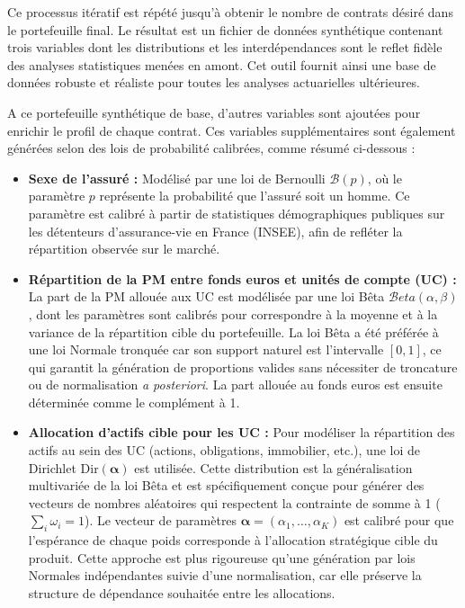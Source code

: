 Ce processus itératif est répété jusqu'à obtenir le nombre de contrats désiré dans le portefeuille final. Le résultat est un fichier de données synthétique contenant trois variables dont les distributions et les interdépendances sont le reflet fidèle des analyses statistiques menées en amont. Cet outil fournit ainsi une base de données robuste et réaliste pour toutes les analyses actuarielles ultérieures.

A ce portefeuille synthétique de base, d'autres variables sont ajoutées pour enrichir le profil de chaque contrat. Ces variables supplémentaires sont également générées selon des lois de probabilité calibrées, comme résumé ci-dessous :

\begin{itemize}
    \item \textbf{Sexe de l'assuré :} Modélisé par une loi de Bernoulli $\mathcal{B}(p)$, où le paramètre $p$ représente la probabilité que l'assuré soit un homme. Ce paramètre est calibré à partir de statistiques démographiques publiques sur les détenteurs d'assurance-vie en France (INSEE), afin de refléter la répartition observée sur le marché.

    \item \textbf{Répartition de la PM entre fonds euros et unités de compte (UC) :} La part de la PM allouée aux UC est modélisée par une loi Bêta $\mathcal{B}eta(\alpha, \beta)$, dont les paramètres sont calibrés pour correspondre à la moyenne et à la variance de la répartition cible du portefeuille. La loi Bêta a été préférée à une loi Normale tronquée car son support naturel est l'intervalle $[0, 1]$, ce qui garantit la génération de proportions valides sans nécessiter de troncature ou de normalisation \textit{a posteriori}. La part allouée au fonds euros est ensuite déterminée comme le complément à 1.

    \item \textbf{Allocation d'actifs cible pour les UC :} Pour modéliser la répartition des actifs au sein des UC (actions, obligations, immobilier, etc.), une loi de Dirichlet $\text{Dir}(\boldsymbol{\alpha})$ est utilisée. Cette distribution est la généralisation multivariée de la loi Bêta et est spécifiquement conçue pour générer des vecteurs de nombres aléatoires qui respectent la contrainte de somme à 1 ($\sum_{i} \omega_i = 1$). Le vecteur de paramètres $\boldsymbol{\alpha} = (\alpha_1, \dots, \alpha_K)$ est calibré pour que l'espérance de chaque poids corresponde à l'allocation stratégique cible du produit. Cette approche est plus rigoureuse qu'une génération par lois Normales indépendantes suivie d'une normalisation, car elle préserve la structure de dépendance souhaitée entre les allocations.


\end{itemize}
